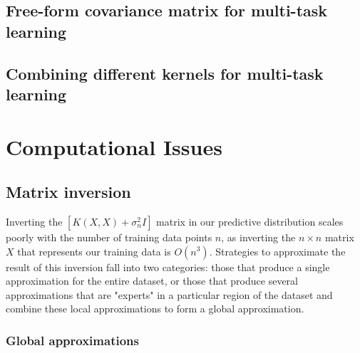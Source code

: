 \documentclass[10pt]{article}
\begin{document}
\subsection{Free-form covariance matrix for multi-task learning \cite{freeform-kernels}}


\subsection{Combining different kernels for multi-task learning \cite{multi-kernels}}



% 
% 
% 
% 



\section{Computational Issues}


\subsection{Matrix inversion \cite{big-data}}
Inverting the $[K(X,X) + \sigma^2_nI]$ matrix in our predictive distribution scales poorly with the number of training data points $n$, as inverting the $n \times n$ matrix $X$ that represents our training data is $O(n^3)$. Strategies to approximate the result of this inversion fall into two categories: those that produce a single approximation for the entire dataset, or those that produce several approximations that are "experts" in a particular region of the dataset and combine these local approximations to form a global approximation.

\subsubsection{Global approximations}
\end{document}
